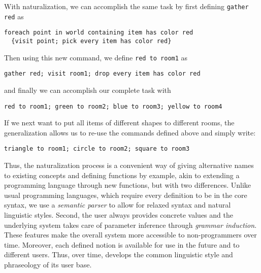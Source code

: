 \begin{example}
With naturalization, we can accomplish the same task by first defining
\lstinline{gather red} as
  \begin{lstlisting}
foreach point in world containing item has color red
  {visit point; pick every item has color red}
  \end{lstlisting}
Then using this new command, we define \lstinline{red to room1} as
\begin{lstlisting}
gather red; visit room1; drop every item has color red
  \end{lstlisting}
and finally we can accomplish our complete task with
\begin{lstlisting}
red to room1; green to room2; blue to room3; yellow to room4
\end{lstlisting}
%
If we next want to put all items of different shapes to different rooms,
the generalization allows us to re-use the commands defined above and simply
write:
  \begin{lstlisting}
triangle to room1; circle to room2; square to room3
  \end{lstlisting}
\end{example}

Thus, the naturalization process is a convenient way of
giving alternative names to existing concepts and defining functions by example,
akin to extending a programming language through new functions, but with two differences.
Unlike usual programming languages, which require every definition to be in the core syntax,
we use a \emph{semantic parser} to allow for relaxed syntax and natural linguistic styles.
Second, the user always provides concrete values and the underlying system takes care of parameter inference
through \emph{grammar induction}.
These features make the overall system more accessible to non-programmers over time.
%
%
Moreover, each defined notion is available for use in the future and to different users.
Thus, over time, \tool develops the common linguistic style and phraseology of its user base.

